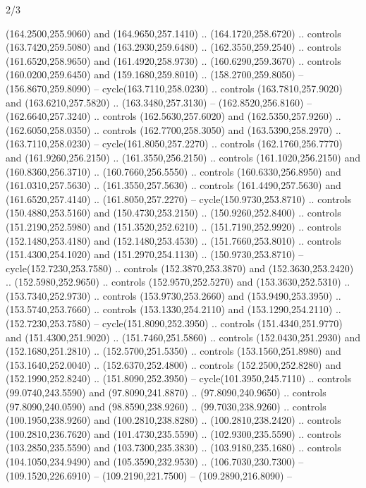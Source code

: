 \begin{flagdescription}{2/3}
\begin{scope}[xshift=0.5\flaglength,yshift=0.5\flagwidth,scale=\stretchfactor]
\begin{scope}[scale=0.001645\flagwidth,yshift=65mm,xshift=-63mm]
\begin{scope}[y=0.80pt, x=0.80pt, yscale=-1,]
\begin{scope}[cm={{1.33333,0.0,0.0,1.33333,(0.0,1e-05)}}]
  (164.2500,255.9060) and (164.9650,257.1410) .. (164.1720,258.6720) .. controls
  (163.7420,259.5080) and (163.2930,259.6480) .. (162.3550,259.2540) .. controls
  (161.6520,258.9650) and (161.4920,258.9730) .. (160.6290,259.3670) .. controls
  (160.0200,259.6450) and (159.1680,259.8010) .. (158.2700,259.8050) --
  (156.8670,259.8090) -- cycle(163.7110,258.0230) .. controls
  (163.7810,257.9020) and (163.6210,257.5820) .. (163.3480,257.3130) --
  (162.8520,256.8160) -- (162.6640,257.3240) .. controls (162.5630,257.6020) and
  (162.5350,257.9260) .. (162.6050,258.0350) .. controls (162.7700,258.3050) and
  (163.5390,258.2970) .. (163.7110,258.0230) -- cycle(161.8050,257.2270) ..
  controls (162.1760,256.7770) and (161.9260,256.2150) .. (161.3550,256.2150) ..
  controls (161.1020,256.2150) and (160.8360,256.3710) .. (160.7660,256.5550) ..
  controls (160.6330,256.8950) and (161.0310,257.5630) .. (161.3550,257.5630) ..
  controls (161.4490,257.5630) and (161.6520,257.4140) .. (161.8050,257.2270) --
  cycle(150.9730,253.8710) .. controls (150.4880,253.5160) and
  (150.4730,253.2150) .. (150.9260,252.8400) .. controls (151.2190,252.5980) and
  (151.3520,252.6210) .. (151.7190,252.9920) .. controls (152.1480,253.4180) and
  (152.1480,253.4530) .. (151.7660,253.8010) .. controls (151.4300,254.1020) and
  (151.2970,254.1130) .. (150.9730,253.8710) -- cycle(152.7230,253.7580) ..
  controls (152.3870,253.3870) and (152.3630,253.2420) .. (152.5980,252.9650) ..
  controls (152.9570,252.5270) and (153.3630,252.5310) .. (153.7340,252.9730) ..
  controls (153.9730,253.2660) and (153.9490,253.3950) .. (153.5740,253.7660) ..
  controls (153.1330,254.2110) and (153.1290,254.2110) .. (152.7230,253.7580) --
  cycle(151.8090,252.3950) .. controls (151.4340,251.9770) and
  (151.4300,251.9020) .. (151.7460,251.5860) .. controls (152.0430,251.2930) and
  (152.1680,251.2810) .. (152.5700,251.5350) .. controls (153.1560,251.8980) and
  (153.1640,252.0040) .. (152.6370,252.4800) .. controls (152.2500,252.8280) and
  (152.1990,252.8240) .. (151.8090,252.3950) -- cycle(101.3950,245.7110) ..
  controls (99.0740,243.5590) and (97.8090,241.8870) .. (97.8090,240.9650) ..
  controls (97.8090,240.0590) and (98.8590,238.9260) .. (99.7030,238.9260) ..
  controls (100.1950,238.9260) and (100.2810,238.8280) .. (100.2810,238.2420) ..
  controls (100.2810,236.7620) and (101.4730,235.5590) .. (102.9300,235.5590) ..
  controls (103.2850,235.5590) and (103.7300,235.3830) .. (103.9180,235.1680) ..
  controls (104.1050,234.9490) and (105.3590,232.9530) .. (106.7030,230.7300) --
  (109.1520,226.6910) -- (109.2190,221.7500) -- (109.2890,216.8090) --

\end{scope}
\end{scope}
\end{scope}
\end{scope}
\end{flagdescription}
